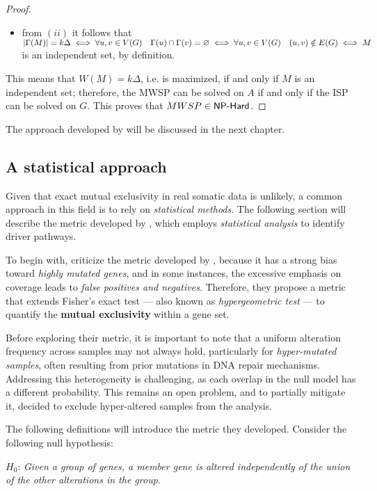 \begin{proof}
\begin{itemize}
        \item from $(ii)$ it follows that $\left|\Gamma(M)\right| = k \Delta \iff \forall u, v \in V(G) \quad \Gamma(u) \cap \Gamma(v) = \varnothing \iff \forall u, v \in V(G) \quad (u, v) \notin E(G) \iff M$ is an independent set, by definition.
    \end{itemize}

    This means that $W(M) = k \Delta$, i.e. is maximized, if and only if $M$ is an independent set; therefore, the MWSP can be solved on $A$ if and only if the ISP can be solved on $G$. This proves that $MWSP \in \textsf{NP-Hard}$.
\end{proof}

The approach developed by \textcite{dendrix} will be discussed in the next chapter.

\subsection{A statistical approach} \label{mutex_chap2}

Given that exact mutual exclusivity in real somatic data is unlikely, a common approach in this field is to rely on \textit{statistical methods}. The following section will describe the metric developed by \textcite{mutex}, which employs \textit{statistical analysis} to identify driver pathways.

To begin with, \textcite{mutex} criticize the metric developed by \textcite{dendrix}, because it has a strong bias toward \textit{highly mutated genes}, and in some instances, the excessive emphasis on coverage leads to \textit{false positives and negatives}. Therefore, they propose a metric that extends Fisher's exact test --- also known as \textit{hypergeometric test} --- to quantify the \textbf{mutual exclusivity} within a gene set.

Before exploring their metric, it is important to note that a uniform alteration frequency across samples may not always hold, particularly for \textit{hyper-mutated samples}, often resulting from prior mutations in DNA repair mechanisms. Addressing this heterogeneity is challenging, as each overlap in the null model has a different probability. This remains an open problem, and to partially mitigate it, \textcite{mutex} decided to exclude hyper-altered samples from the analysis.

The following definitions will introduce the metric they developed. Consider the following null hypothesis:

\begin{displayquote} \label{H_0}
    $H_0$: \textit{Given a group of genes, a member gene is altered independently of the union of the other alterations in the group}.
\end{displayquote}

